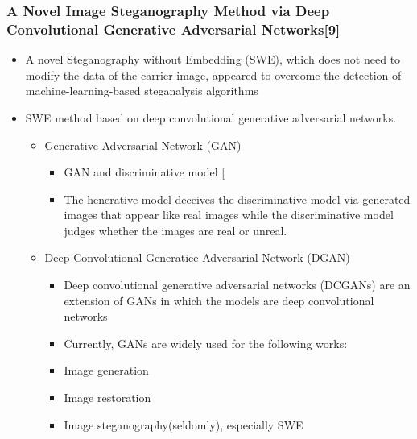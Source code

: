 \documentclass{beamer} %
\theoremstyle{definition} %
\begin{document}
\begin{frame}
\frametitle{A Novel Image Steganography Method via Deep Convolutional Generative Adversarial Networks[9]  }
\begin{itemize}
	\item A novel Steganography without Embedding (SWE), which does not need to modify the data of the carrier image, appeared to overcome the detection of machine-learning-based steganalysis algorithms 
	\item SWE method based on deep convolutional generative adversarial networks.
	\begin{itemize}
		\item Generative Adversarial Network (GAN)
		\begin{itemize}
		    \item  GAN and discriminative model [ 
		    \item The henerative model deceives the discriminative model via generated images that appear like real images while the discriminative
		    model judges whether the images are real or unreal. 
		\end{itemize}
		\item Deep Convolutional Generatice Adversarial Network (DGAN)
		\begin{itemize}
		    \item Deep convolutional generative adversarial networks (DCGANs) are an extension of GANs in which the models are deep convolutional
		    networks 
		    \item Currently, GANs are widely used for the following works: 
		    \item Image generation 
		    \item Image restoration
		    \item Image steganography(seldomly), especially SWE  
		\end{itemize}
			\end{itemize}
		\end{itemize}
\end{frame}
\end{document}
